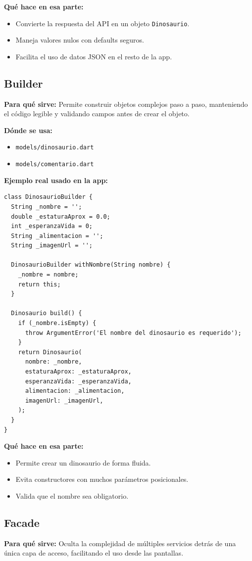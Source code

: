 \documentclass[12pt,a4paper]{article}
\begin{document}
\textbf{Qué hace en esa parte:}
\begin{itemize}
    \item Convierte la respuesta del API en un objeto \texttt{Dinosaurio}.
    \item Maneja valores nulos con defaults seguros.
    \item Facilita el uso de datos JSON en el resto de la app.
\end{itemize}

\subsection{Builder}
\textbf{Para qué sirve:} Permite construir objetos complejos paso a paso, manteniendo el código legible y validando campos antes de crear el objeto.

\textbf{Dónde se usa:}
\begin{itemize}
    \item \texttt{models/dinosaurio.dart}
    \item \texttt{models/comentario.dart}
\end{itemize}

\textbf{Ejemplo real usado en la app:}
\begin{lstlisting}
class DinosaurioBuilder {
  String _nombre = '';
  double _estaturaAprox = 0.0;
  int _esperanzaVida = 0;
  String _alimentacion = '';
  String _imagenUrl = '';

  DinosaurioBuilder withNombre(String nombre) {
    _nombre = nombre;
    return this;
  }

  Dinosaurio build() {
    if (_nombre.isEmpty) {
      throw ArgumentError('El nombre del dinosaurio es requerido');
    }
    return Dinosaurio(
      nombre: _nombre,
      estaturaAprox: _estaturaAprox,
      esperanzaVida: _esperanzaVida,
      alimentacion: _alimentacion,
      imagenUrl: _imagenUrl,
    );
  }
}
\end{lstlisting}

\textbf{Qué hace en esa parte:}
\begin{itemize}
    \item Permite crear un dinosaurio de forma fluida.
    \item Evita constructores con muchos parámetros posicionales.
    \item Valida que el nombre sea obligatorio.
\end{itemize}

\subsection{Facade}
\textbf{Para qué sirve:} Oculta la complejidad de múltiples servicios detrás de una única capa de acceso, facilitando el uso desde las pantallas.
\end{document}
